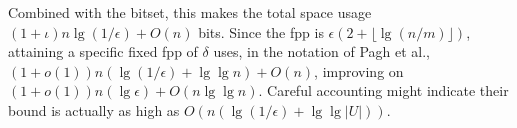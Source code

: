 \documentclass[letterpaper]{article}
\begin{document}
Combined with the bitset, this makes the total space usage $(1 + \iota) n \lg (1/\epsilon) + O(n)$ bits.
Since the fpp is $\epsilon (2 + \lfloor \lg (n/m) \rfloor)$, attaining a specific fixed fpp of $\delta$ uses, in the notation of Pagh et al., $(1 + o(1)) n (\lg (1/\epsilon) + \lg \lg n) + O(n)$, improving on $(1 + o(1)) n (\lg \epsilon) + O(n \lg \lg n)$.
Careful accounting might indicate their bound is actually as high as $O(n (\lg (1/\epsilon) + \lg \lg |U|))$.
















\end{document}
